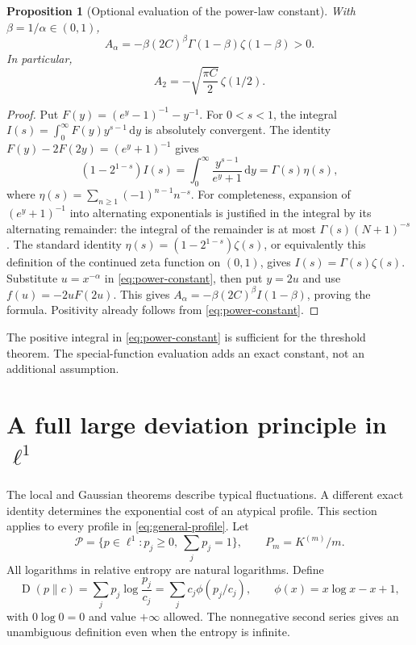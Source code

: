 \documentclass[11pt,a4paper]{article}
\numberwithin{equation}{section}
\newtheorem{proposition}[theorem]{Proposition}
\theoremstyle{definition}
\theoremstyle{remark}
\newcommand{\KL}{\operatorname{D}}
\newcommand{\dd}{\,\mathrm d}
\newcommand{\simplex}{\mathcal P}
\begin{document}
\begin{proposition}[Optional evaluation of the power-law constant]
\label{prop:power-zeta}
With $\beta=1/\alpha\in(0,1)$,
\begin{equation}
A_\alpha=-\beta(2C)^\beta\Gamma(1-\beta)\zeta(1-\beta)>0.
\label{eq:power-zeta}
\end{equation}
In particular,
\begin{equation}
A_2=-\sqrt{\frac{\pi C}{2}}\,\zeta(1/2).
\label{eq:a2}
\end{equation}
\end{proposition}
\begin{proof}
Put $F(y)=(e^y-1)^{-1}-y^{-1}$. For $0<s<1$, the integral
$I(s)=\int_0^\infty F(y)y^{s-1}\dd y$ is absolutely convergent.
The identity $F(y)-2F(2y)=(e^y+1)^{-1}$ gives
\[
(1-2^{1-s})I(s)=\int_0^\infty\frac{y^{s-1}}{e^y+1}\dd y
=\Gamma(s)\eta(s),
\]
where $\eta(s)=\sum_{n\ge1}(-1)^{n-1}n^{-s}$.
For completeness, expansion of $(e^y+1)^{-1}$ into alternating
exponentials is justified in the integral by its alternating remainder:
the integral of the remainder is at most
$\Gamma(s)(N+1)^{-s}$. The standard identity
$\eta(s)=(1-2^{1-s})\zeta(s)$, or equivalently this definition of
the continued zeta function on $(0,1)$, gives $I(s)=\Gamma(s)\zeta(s)$.
Substitute $u=x^{-\alpha}$ in \cref{eq:power-constant}, then put
$y=2u$ and use $f(u)=-2uF(2u)$. This gives
$A_\alpha=-\beta(2C)^\beta I(1-\beta)$, proving the formula.
Positivity already follows from \cref{eq:power-constant}.
\end{proof}

The positive integral in \cref{eq:power-constant} is sufficient for the
threshold theorem. The special-function evaluation adds an exact constant,
not an additional assumption.

\section{A full large deviation principle in \texorpdfstring{$\ell^1$}{l1}}
\label{sec:ldp}

The local and Gaussian theorems describe typical fluctuations. A different
exact identity determines the exponential cost of an atypical profile.
This section applies to every profile in \cref{eq:general-profile}.
Let
\[
\simplex=\{p\in\ell^1:p_j\ge0,\ \sum_jp_j=1\},\qquad P_m=K^{(m)}/m.
\]
All logarithms in relative entropy are natural logarithms. Define
\begin{equation}
\KL(p\|c)=\sum_jp_j\log\frac{p_j}{c_j}
=\sum_jc_j\phi(p_j/c_j),\qquad
\phi(x)=x\log x-x+1,
\label{eq:entropy}
\end{equation}
with $0\log0=0$ and value $+\infty$ allowed. The nonnegative second
series gives an unambiguous definition even when the entropy is infinite.
\end{document}
